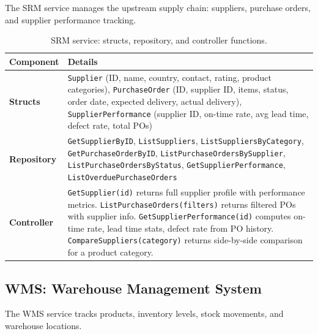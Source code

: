 \documentclass[12pt,a4paper]{report}
\begin{document}
The SRM service manages the upstream supply chain: suppliers, purchase orders, and supplier performance tracking.

\begin{table}[H]
\centering\small
\caption{SRM service: structs, repository, and controller functions.}
\begin{tabularx}{\textwidth}{@{} l X @{}}
\toprule
\textbf{Component} & \textbf{Details} \\
\midrule
\textbf{Structs} &
    \texttt{Supplier} (ID, name, country, contact, rating, product categories),
    \texttt{PurchaseOrder} (ID, supplier ID, items, status, order date, expected delivery, actual delivery),
    \texttt{SupplierPerformance} (supplier ID, on-time rate, avg lead time, defect rate, total POs) \\
\textbf{Repository} &
    \texttt{GetSupplierByID}, \texttt{ListSuppliers}, \texttt{ListSuppliersByCategory},
    \texttt{GetPurchaseOrderByID}, \texttt{ListPurchaseOrdersBySupplier}, \texttt{ListPurchaseOrdersByStatus},
    \texttt{GetSupplierPerformance}, \texttt{ListOverduePurchaseOrders} \\
\textbf{Controller} &
    \texttt{GetSupplier(id)} returns full supplier profile with performance metrics.
    \texttt{ListPurchaseOrders(filters)} returns filtered POs with supplier info.
    \texttt{GetSupplierPerformance(id)} computes on-time rate, lead time stats, defect rate from PO history.
    \texttt{CompareSuppliers(category)} returns side-by-side comparison for a product category. \\
\bottomrule
\end{tabularx}
\end{table}

\subsection{WMS: Warehouse Management System}

The WMS service tracks products, inventory levels, stock movements, and warehouse locations.
\end{document}
